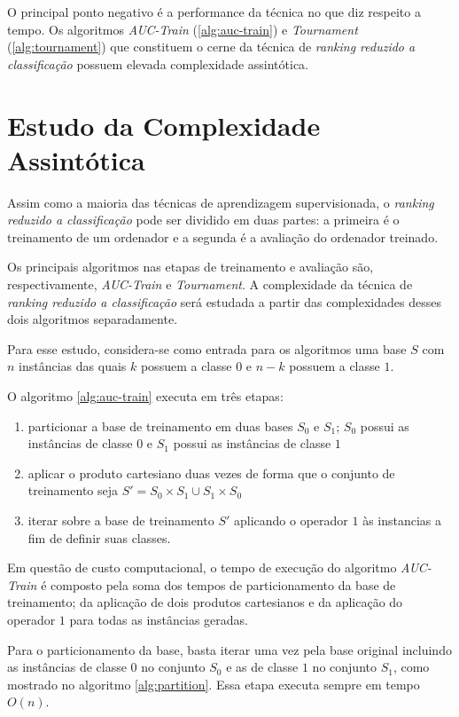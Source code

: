 O principal ponto negativo é a performance da técnica no que diz respeito a tempo. Os algoritmos \emph{AUC-Train} (\ref{alg:auc-train}) e \emph{Tournament} (\ref{alg:tournament}) que constituem o cerne da técnica de \emph{ranking reduzido a classificação} possuem elevada complexidade assintótica.


\section{Estudo da Complexidade Assintótica}

Assim como a maioria das técnicas de aprendizagem supervisionada, o \emph{ranking reduzido a classificação} pode ser dividido em duas partes: a primeira é o treinamento de um ordenador e a segunda é a avaliação do ordenador treinado.

Os principais algoritmos nas etapas de treinamento e avaliação são, respectivamente, \emph{AUC-Train} e \emph{Tournament}. A complexidade da técnica de \emph{ranking reduzido a classificação} será estudada a partir das complexidades desses dois algoritmos separadamente.

Para esse estudo, considera-se como entrada para os algoritmos uma base $S$ com $n$ instâncias das quais $k$ possuem a classe $0$ e $n - k$ possuem a classe $1$.

O algoritmo \ref{alg:auc-train} executa em três etapas:

\begin{enumerate}
    \item particionar a base de treinamento em duas bases $S_0$ e $S_1$; $S_0$ possui as instâncias de classe $0$ e $S_1$ possui as instâncias de classe $1$
    \item aplicar o produto cartesiano duas vezes de forma que o conjunto de treinamento seja $S' = S_0 \times S_1 \cup S_1 \times S_0$
    \item iterar sobre a base de treinamento $S'$ aplicando o operador $1$ às instancias a fim de definir suas classes.
\end{enumerate}

Em questão de custo computacional, o tempo de execução do algoritmo \emph{AUC-Train} é composto pela soma dos tempos de particionamento da base de treinamento; da aplicação de dois produtos cartesianos e da aplicação do operador $1$ para todas as instâncias geradas.

Para o particionamento da base, basta iterar uma vez pela base original incluindo as instâncias de classe $0$ no conjunto $S_0$ e as de classe $1$ no conjunto $S_1$, como mostrado no algoritmo \ref{alg:partition}. Essa etapa executa sempre em tempo $O(n)$.

